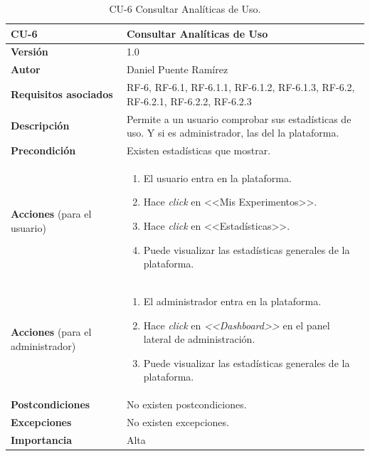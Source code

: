 \begin{table}[p]
\centering
\begin{tabularx}{\linewidth}{ p{} p{} }
\toprule
\textbf{CU-6} & \textbf{Consultar Analíticas de Uso}\\
\toprule
\textbf{Versión} & 1.0\\
\textbf{Autor} & Daniel Puente Ramírez\\
\textbf{Requisitos asociados} & RF-6, RF-6.1, RF-6.1.1, RF-6.1.2, RF-6.1.3, RF-6.2, RF-6.2.1, RF-6.2.2, RF-6.2.3\\
\textbf{Descripción} & Permite a un usuario comprobar sus estadísticas de uso. Y si es administrador, las del la plataforma.\\
\textbf{Precondición} & Existen estadísticas que mostrar.\\
\textbf{Acciones} (para el usuario) &
\begin{enumerate}
\def\labelenumi{\arabic{enumi}.}
\tightlist
\item El usuario entra en la plataforma.
\item Hace \textit{click} en <<Mis Experimentos>>.
\item Hace \textit{click} en <<Estadísticas>>.
\item Puede visualizar las estadísticas generales de la plataforma.
\end{enumerate}\\
\textbf{Acciones} (para el administrador) &
\begin{enumerate}
\def\labelenumi{\arabic{enumi}.}
\tightlist
\item El administrador entra en la plataforma.
\item Hace \textit{click} en \textit{<<Dashboard>>} en el panel lateral de administración.
\item Puede visualizar las estadísticas generales de la plataforma.
\end{enumerate}\\
\textbf{Postcondiciones} & No existen postcondiciones.\\
\textbf{Excepciones} & No existen excepciones.\\
\textbf{Importancia} & Alta \\
\bottomrule
\end{tabularx}
\caption{CU-6 Consultar Analíticas de Uso.}
\end{table}

